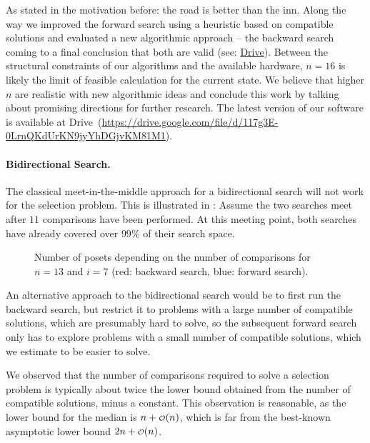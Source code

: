 \documentclass[twoside,leqno,twocolumn]{article}
\newcommand\smallO{
\mathchoice
{{\scriptstyle\mathcal{O}}}%
{{\scriptstyle\mathcal{O}}}%
{{\scriptscriptstyle\mathcal{O}}}%
{\scalebox{.50}{$\scriptscriptstyle\mathcal{O}$}}%
}
\newcommand{\projectURL}[0]{https://drive.google.com/file/d/117g3E-0LrnQKdUrKN9jyYhDGjvKM81M1} %
\newcommand{\projectServer}[0]{Drive} %
\begin{document}
As stated in the motivation before: the road is better than the inn.
Along the way we improved the forward search using a heuristic based on compatible solutions and evaluated a new algorithmic approach -- the backward search coming to a final conclusion that both are valid (see: \href{\projectURL}{\projectServer}).
%
Between the structural constraints of our algorithms and the available hardware, $n=16$ is likely the limit of feasible calculation for the current state.
We believe that higher $n$ are realistic with new algorithmic ideas and conclude this work by talking about promising directions for further research.
The latest version of our software is available at \projectServer~(\url{\projectURL}).

\paragraph{Bidirectional Search.}
The classical meet-in-the-middle approach for a bidirectional search will not work for the selection problem.
This is illustrated in :
Assume the two searches meet after $11$ comparisons have been performed.
At this meeting point, both searches have already covered over $99\%$ of their search space.

\begin{figure}[!b]
  \centering
  
  \caption{Number of posets depending on the number of comparisons for $n = 13$ and $i = 7$ (red: backward search, blue: forward search).}
  \label{fig:backward_forward_count_13_6}
\end{figure}

An alternative approach to the bidirectional search would be to first run the backward search, but restrict it to problems with a large number of compatible solutions, which are presumably hard to solve, so the subsequent forward search only has to explore problems with a small number of compatible solutions, which we estimate to be easier to solve.

We observed that the number of comparisons required to solve a selection problem is typically about twice the lower bound obtained from the number of compatible solutions, minus a constant.
This observation is reasonable, as the lower bound for the median is $n + \smallO(n)$, which is far from the best-known asymptotic lower bound $2n + \smallO(n)$.
\end{document}
